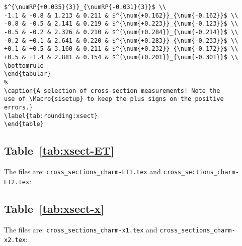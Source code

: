 \documentclass[UKenglish]{latex/atlasdoc}
\newcommand*{\numRP}[2]{\num[round-mode=places, round-precision=#2]{#1}}
\newcommand*\Macro[1]{\texttt{\textbackslash#1}}
\begin{document}
\begin{verbatim}
$^{\numRP{+0.035}{3}}_{\numRP{-0.031}{3}}$ \\
-1.1 & -0.8 & 1.213 & 0.211 & $^{\num{+0.162}}_{\num{-0.162}}$ \\
-0.8 & -0.5 & 2.141 & 0.219 & $^{\num{+0.223}}_{\num{-0.123}}$ \\
-0.5 & -0.2 & 2.326 & 0.210 & $^{\num{+0.284}}_{\num{-0.214}}$ \\
-0.2 & +0.1 & 2.641 & 0.220 & $^{\num{+0.283}}_{\num{-0.233}}$ \\
+0.1 & +0.5 & 3.160 & 0.211 & $^{\num{+0.232}}_{\num{-0.172}}$ \\
+0.5 & +1.4 & 2.881 & 0.154 & $^{\num{+0.201}}_{\num{-0.301}}$ \\
\bottomrule
\end{tabular}
%
\caption{A selection of cross-section measurements! Note the
use of \Macro{sisetup} to keep the plus signs on the positive
errors.}
\label{tab:rounding:xsect}
\end{table}
\end{verbatim}

\subsection{Table~\protect\ref{tab:xsect-ET}}
The files are: \texttt{cross\_sections\_charm-ET1.tex} and 
\texttt{cross\_sections\_charm-ET2.tex}:
{\scriptsize
  
}
{\scriptsize
  
}

\subsection{Table~\protect\ref{tab:xsect-x}}

The files are: \texttt{cross\_sections\_charm-x1.tex} and 
\texttt{cross\_sections\_charm-x2.tex}:
{\scriptsize
  
}
{\tiny
  
}

\printbibliography
\end{document}
